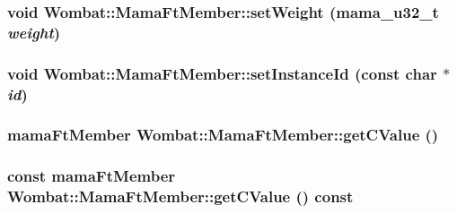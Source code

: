 \label{classWombat_1_1MamaFtMember_ae85d406375efd4325671c4109df3f56d}
\hypertarget{classWombat_1_1MamaFtMember_afd89c66a28f99b6f716e70fe12e7473f}{
\subsubsection[{setWeight}]{\setlength{\rightskip}{0pt plus 5cm}void Wombat::MamaFtMember::setWeight (mama\_\-u32\_\-t {\em weight})}}
\label{classWombat_1_1MamaFtMember_afd89c66a28f99b6f716e70fe12e7473f}
\hypertarget{classWombat_1_1MamaFtMember_aecc24a6fc92f4fe699e6003c0297ddb3}{
\subsubsection[{setInstanceId}]{\setlength{\rightskip}{0pt plus 5cm}void Wombat::MamaFtMember::setInstanceId (const char $\ast$ {\em id})}}
\label{classWombat_1_1MamaFtMember_aecc24a6fc92f4fe699e6003c0297ddb3}
\hypertarget{classWombat_1_1MamaFtMember_a9f9d307fc61f5283850527f313763d18}{
\subsubsection[{getCValue}]{\setlength{\rightskip}{0pt plus 5cm}mamaFtMember Wombat::MamaFtMember::getCValue ()}}
\label{classWombat_1_1MamaFtMember_a9f9d307fc61f5283850527f313763d18}
\hypertarget{classWombat_1_1MamaFtMember_a5ba8e9c0b12adfe858d8c7ddeef4dbed}{
\subsubsection[{getCValue}]{\setlength{\rightskip}{0pt plus 5cm}const mamaFtMember Wombat::MamaFtMember::getCValue () const}}
\label{classWombat_1_1MamaFtMember_a5ba8e9c0b12adfe858d8c7ddeef4dbed}


